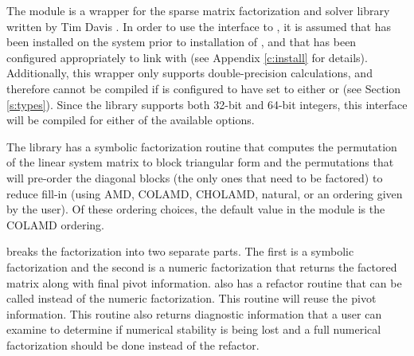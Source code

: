 {\warn} The {\sunlinsolklu} module is a {\sunlinsol} wrapper for
the {\klu} sparse matrix factorization and solver library written by Tim
Davis \cite{KLU_site,DaPa:10}.  In order to use the
{\sunlinsolklu} interface to {\klu}, it is assumed that {\klu} has
been installed on the system prior to installation of {\sundials}, and
that {\sundials} has been configured appropriately to link with {\klu}
(see Appendix \ref{c:install} for details).  Additionally, this
wrapper only supports double-precision calculations, and therefore
cannot be compiled if {\sundials} is configured to have 
set to either  or  (see Section \ref{s:types}).
Since the {\klu} library supports both 32-bit and 64-bit integers, this
interface will be compiled for either of the available  options.

The {\klu} library has a symbolic factorization routine that computes
the permutation of the linear system matrix to block triangular form
and the permutations that will pre-order the diagonal blocks (the only
ones that need to be factored) to reduce fill-in (using AMD, COLAMD,
CHOLAMD, natural, or an ordering given by the user).  Of these
ordering choices, the default value in the {\sunlinsolklu} 
module is the COLAMD ordering.

{\klu} breaks the factorization into two separate parts.  The first is
a symbolic factorization and the second is a numeric factorization
that returns the factored matrix along with final pivot information.   
{\klu} also has a refactor routine that can be called instead of the numeric 
factorization.  This routine will reuse the pivot information.  This routine 
also returns diagnostic information that a user can examine to determine if 
numerical stability is being lost and a full numerical factorization should 
be done instead of the refactor.

